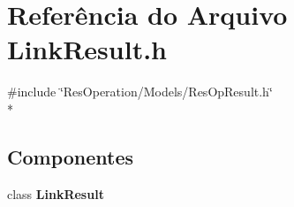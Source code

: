 \section{Referência do Arquivo Link\+Result.\+h}
\label{_models_2_link_2_link_result_8h}
{\ttfamily \#include \char`\"{}Res\+Operation/\+Models/\+Res\+Op\+Result.\+h\char`\"{}}\\*
\subsection*{Componentes}
\begin{DoxyCompactItemize}
\item 
class {\bf Link\+Result}
\end{DoxyCompactItemize}

